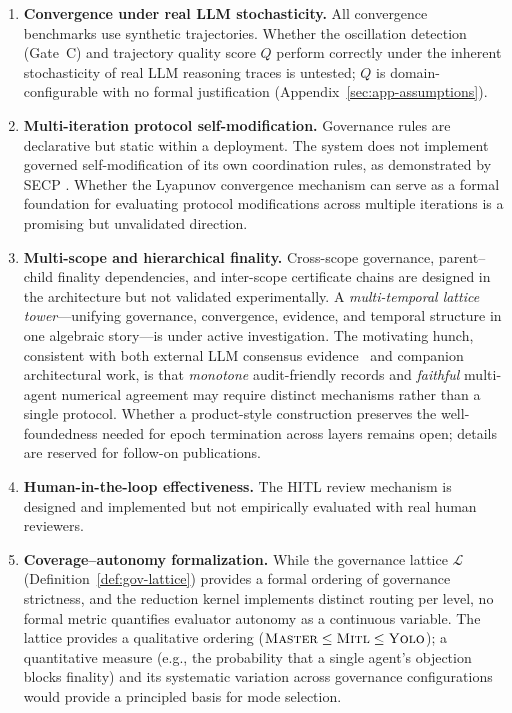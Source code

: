\documentclass[11pt]{article}
\begin{document}
\begin{enumerate}
  \item \textbf{Convergence under real LLM stochasticity.} All convergence benchmarks use synthetic trajectories. Whether the oscillation detection (Gate~C) and trajectory quality score $Q$ perform correctly under the inherent stochasticity of real LLM reasoning traces is untested; $Q$ is domain-configurable with no formal justification (Appendix~\ref{sec:app-assumptions}).
  \item \textbf{Multi-iteration protocol self-modification.} Governance rules are declarative but static within a deployment. The system does not implement governed self-modification of its own coordination rules, as demonstrated by SECP \cite{delachica2026}. Whether the Lyapunov convergence mechanism can serve as a formal foundation for evaluating protocol modifications across multiple iterations is a promising but unvalidated direction.
  \item \textbf{Multi-scope and hierarchical finality.} Cross-scope governance, parent--child finality dependencies, and inter-scope certificate chains are designed in the architecture but not validated experimentally. A \emph{multi-temporal lattice tower}---unifying governance, convergence, evidence, and temporal structure in one algebraic story---is under active investigation. The motivating hunch, consistent with both external LLM consensus evidence~\cite{yazici2026opinion} and companion architectural work, is that \emph{monotone} audit-friendly records and \emph{faithful} multi-agent numerical agreement may require distinct mechanisms rather than a single protocol. Whether a product-style construction preserves the well-foundedness needed for epoch termination across layers remains open; details are reserved for follow-on publications.
  \item \textbf{Human-in-the-loop effectiveness.} The HITL review mechanism is designed and implemented but not empirically evaluated with real human reviewers.
  \item \textbf{Coverage--autonomy formalization.} While the governance lattice $\mathcal{L}$ (Definition~\ref{def:gov-lattice}) provides a formal ordering of governance strictness, and the reduction kernel implements distinct routing per level, no formal metric quantifies evaluator autonomy as a continuous variable. The lattice provides a qualitative ordering ($\textsc{Master} \leq \textsc{Mitl} \leq \textsc{Yolo}$); a quantitative measure (e.g., the probability that a single agent's objection blocks finality) and its systematic variation across governance configurations would provide a principled basis for mode selection.
\end{enumerate}
\end{document}
